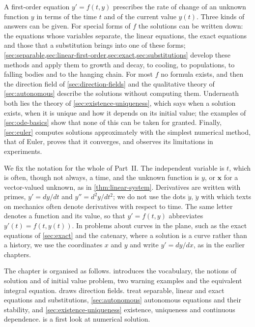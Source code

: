 A first-order equation $y'=f(t,y)$ prescribes the rate of change of an unknown function $y$ in terms of the time $t$ and of the current value $y(t)$. Three kinds of answers can be given. For special forms of $f$ the solutions can be written down: the equations whose variables separate, the linear equations, the exact equations and those that a substitution brings into one of these forms; \cref{sec:separable,sec:linear-first-order,sec:exact,sec:substitutions} develop these methods and apply them to growth and decay, to cooling, to populations, to falling bodies and to the hanging chain. For most $f$ no formula exists, and then the direction field of \cref{sec:direction-fields} and the qualitative theory of \cref{sec:autonomous} describe the solutions without computing them. Underneath both lies the theory of \cref{sec:existence-uniqueness}, which says when a solution exists, when it is unique and how it depends on its initial value; the examples of \cref{sec:ode-basics} show that none of this can be taken for granted. Finally, \cref{sec:euler} computes solutions approximately with the simplest numerical method, that of Euler, proves that it converges, and observes its limitations in experiments.

We fix the notation for the whole of Part~II. The independent variable is $t$, which is often, though not always, a time, and the unknown function is $y$, or $\mathbf x$ for a vector-valued unknown, as in \cref{thm:linear-system}. Derivatives are written with primes, $y'=dy/dt$ and $y''=d^2y/dt^2$; we do not use the dots $\dot y$, $\ddot y$ with which texts on mechanics often denote derivatives with respect to time. The same letter denotes a function and its value, so that $y'=f(t,y)$ abbreviates $y'(t)=f(t,y(t))$. In problems about curves in the plane, such as the exact equations of \cref{sec:exact} and the catenary, where a solution is a curve rather than a history, we use the coordinates $x$ and $y$ and write $y'=dy/dx$, as in the earlier chapters.

The chapter is organised as follows.  introduces the vocabulary, the notions of solution and of initial value problem, two warning examples and the equivalent integral equation.  draws direction fields.  treat separable, linear and exact equations and substitutions, \cref{sec:autonomous} autonomous equations and their stability, and \cref{sec:existence-uniqueness} existence, uniqueness and continuous dependence.  is a first look at numerical solution.

